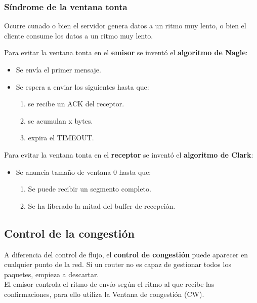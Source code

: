 \newpage
\subsubsection{Síndrome de la ventana tonta}
Ocurre cunado o bien el servidor genera datos a un ritmo muy lento, o bien el cliente consume los datos a un ritmo muy lento.\\
\begin{tcolorbox}[colback=white]
Para evitar la ventana tonta en el \textbf{emisor} se inventó el \textbf{algoritmo de Nagle}:
\begin{itemize}
    \item Se envía el primer mensaje.
    \item Se espera a enviar los siguientes hasta que:
    \begin{enumerate}
        \item se recibe un ACK del receptor.
        \item se acumulan x bytes.
        \item expira el TIMEOUT.
    \end{enumerate}
\end{itemize}
\end{tcolorbox}
\begin{tcolorbox}[colback=white]
Para evitar la ventana tonta en el \textbf{receptor} se inventó el \textbf{algoritmo de Clark}:
\begin{itemize}
    \item Se anuncia tamaño de ventana 0 hasta que:
    \begin{enumerate}
        \item Se puede recibir un segmento completo.
        \item Se ha liberado la mitad del buffer de recepción.
    \end{enumerate}
\end{itemize}
\end{tcolorbox}


\subsection{Control de la congestión}
A diferencia del control de flujo, el \textbf{control de congestión} puede aparecer en cualquier punto de la red. Si un router no es capaz de gestionar todos los paquetes, empieza a descartar.\\

El emisor controla el ritmo de envío según el ritmo al que recibe las confirmaciones, para ello utiliza la Ventana de congestión (CW).\\


